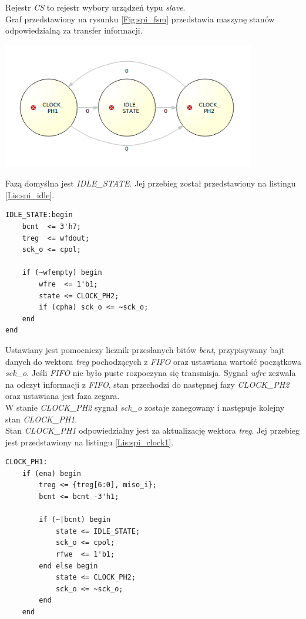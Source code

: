 \documentclass[11pt,a4paper]{article}
\begin{document}
Rejestr \textit{CS} to rejestr wybory urządzeń typu \textit{slave}. \\
Graf przedstawiony na rysunku \ref{Fig:spi_fsm} przedstawia maszynę stanów odpowiedzialną za transfer informacji. \\

					\begin{minipage}[c]{\textwidth}
					\includegraphics[width=\textwidth,height=5.5cm]{./rysunki/fsm_spi.png}
			\end{minipage} 
			 Fazą domyślna jest \textit{IDLE\_STATE}. Jej przebieg został przedstawiony na listingu \ref{Lis:spi_idle}.
			 \begin{minipage}{\textwidth}
\begin{scriptsize}
\begin{lstlisting}[label=Lis:spi_idle,caption=Faza \textit{IDLE\_STATE}]
IDLE_STATE:begin 
	bcnt  <= 3'h7;   
	treg  <= wfdout; 
	sck_o <= cpol;   

	if (~wfempty) begin
		wfre  <= 1'b1;
		state <= CLOCK_PH2;
		if (cpha) sck_o <= ~sck_o;
	end
end
\end{lstlisting}
\end{scriptsize}
\end{minipage}	
Ustawiany jest pomocniczy licznik przesłanych bitów \textit{bcnt}, przypisywany bajt danych do wektora \textit{treg} pochodzących z \textit{FIFO} oraz ustawiana wartość początkowa \textit{sck\_o}. Jeśli \textit{FIFO} nie było puste rozpoczyna się transmisja. Sygnał \textit{wfre} zezwala na odczyt informacji z \textit{FIFO}, stan przechodzi do następnej fazy \textit{CLOCK\_PH2} oraz ustawiana jest faza zegara. \\
W stanie \textit{CLOCK\_PH2} sygnał \textit{sck\_o} zostaje zanegowany i następuje kolejny stan \textit{CLOCK\_PH1}. \\
 Stan \textit{CLOCK\_PH1} odpowiedzialny jest za aktualizację wektora \textit{treg}. Jej przebieg jest przedstawiony na listingu \ref{Lis:spi_clock1}.\\
 			 \begin{minipage}{\textwidth}
\begin{scriptsize}
\begin{lstlisting}[label=Lis:spi_clock1,caption=Faza \textit{CLOCK\_PH1}]
CLOCK_PH1:
	if (ena) begin
		treg <= {treg[6:0], miso_i};
		bcnt <= bcnt -3'h1;

		if (~|bcnt) begin
			state <= IDLE_STATE;
			sck_o <= cpol;
			rfwe  <= 1'b1;
		end else begin
			state <= CLOCK_PH2;
			sck_o <= ~sck_o;
		end
	end
\end{lstlisting}
\end{scriptsize}
\end{minipage}
\end{document}
